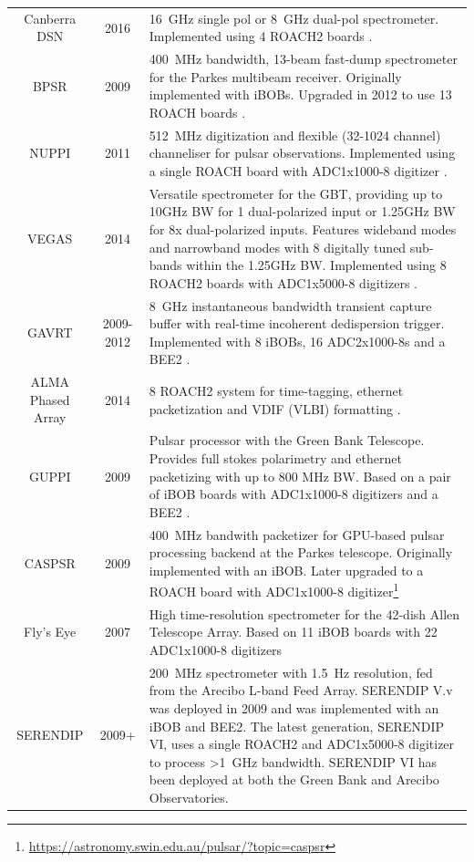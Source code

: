 \documentclass{ws-jai}
\begin{document}
\begin{table}
\begin{tabular}{ccp{10cm}}
  Canberra DSN     & 2016 & 16~GHz single pol or 8~GHz dual-pol spectrometer. Implemented using 4 ROACH2 boards \citep{Kocz, in prep}. \\
  BPSR             & 2009 & 400~MHz bandwidth, 13-beam fast-dump spectrometer for the Parkes multibeam receiver. Originally implemented with iBOBs. Upgraded in 2012 to use 13 ROACH boards \citep{2010MNRAS.409..619K}. \\
  NUPPI            & 2011 & 512~MHz digitization and flexible (32-1024 channel) channeliser for pulsar observations. Implemented using a single ROACH board with ADC1x1000-8 digitizer \citep{2014MNRAS.443.3752L}. \\
  VEGAS            & 2014 & Versatile spectrometer for the GBT, providing up to 10GHz BW for 1 dual-polarized input or 1.25GHz BW for 8x dual-polarized inputs. Features wideband modes and narrowband modes with 8 digitally tuned sub-bands within the 1.25GHz BW. Implemented using 8 ROACH2 boards with ADC1x5000-8 digitizers \citep{chennamangalam2014gpu}. \\
  GAVRT            & 2009-2012 & 8~GHz instantaneous bandwidth transient capture buffer with real-time incoherent dedispersion trigger. Implemented with 8 iBOBs, 16 ADC2x1000-8s and a BEE2 \citep{jon10, JonesDSS28}. \\
  ALMA Phased Array& 2014 & 8 ROACH2 system for time-tagging, ethernet packetization and VDIF (VLBI) formatting \citep{2012evn..confE..53A}. \\
  GUPPI            & 2009 & Pulsar processor with the Green Bank Telescope. Provides full stokes polarimetry and ethernet packetizing with up to 800 MHz BW. Based on a pair of iBOB boards with ADC1x1000-8 digitizers and a BEE2 \citep{guppi}. \\
  CASPSR           & 2009 & 400~MHz bandwith packetizer for GPU-based pulsar processing backend at the Parkes telescope. Originally implemented with an iBOB. Later upgraded to a ROACH board with ADC1x1000-8 digitizer\footnote{\url{https://astronomy.swin.edu.au/pulsar/?topic=caspsr}} \\
  Fly's Eye        & 2007 & High time-resolution spectrometer for the 42-dish Allen Telescope Array. Based on 11 iBOB boards with 22 ADC1x1000-8 digitizers \citep{flyseye} \\
  SERENDIP        & 2009+ & 200~MHz spectrometer with 1.5~Hz resolution, fed from the Arecibo L-band Feed Array. SERENDIP V.v was deployed in 2009 \citep{seti} and was implemented with an iBOB and BEE2. The latest generation, SERENDIP VI, uses a single ROACH2 and ADC1x5000-8 digitizer to process >1~GHz bandwidth. SERENDIP VI has been deployed at both the Green Bank and Arecibo Observatories. \\
\end{tabular}
\end{table}
\end{document}
